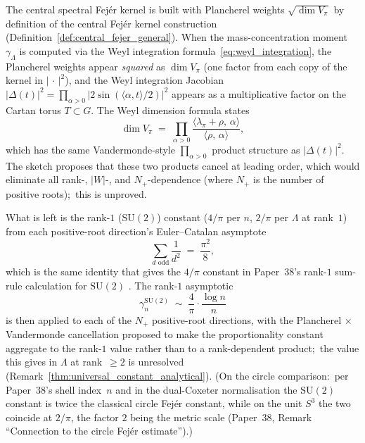 \documentclass[11pt,a4paper]{article}
\theoremstyle{plain}
\theoremstyle{definition}
\newcommand{\Lammax}{\Lambda}
\newcommand{\SU}{\mathrm{SU}}
\begin{document}
The central spectral Fej\'er kernel is built with Plancherel weights
$\sqrt{\dim V_\pi}$ by definition of the central Fej\'er kernel
construction (Definition~\ref{def:central_fejer_general}). When
the mass-concentration moment $\gamma_\Lammax$ is computed via the
Weyl integration formula~\eqref{eq:weyl_integration}, the Plancherel
weights appear \emph{squared} as $\dim V_\pi$ (one factor from each
copy of the kernel in $|\,\cdot\,|^2$), and the Weyl integration
Jacobian $|\Delta(t)|^2 =
\prod_{\alpha > 0} |2 \sin(\langle\alpha, t\rangle/2)|^2$ appears as a
multiplicative factor on the Cartan torus $T \subset G$. The Weyl
dimension formula states
\begin{equation}\label{eq:weyl_dim_universal}
   \dim V_\pi
   \;=\; \prod_{\alpha > 0}
   \frac{\langle \lambda_\pi + \rho,\, \alpha\rangle}
        {\langle\rho,\, \alpha\rangle},
\end{equation}
which has the same Vandermonde-style $\prod_{\alpha > 0}$ product
structure as $|\Delta(t)|^2$. The sketch proposes that these two
products cancel at leading order, which would eliminate all rank-,
$|W|$-, and $N_+$-dependence (where $N_+$ is the number of positive
roots);\ this is unproved.

What is left is the rank-$1$ ($\SU(2)$) constant ($4/\pi$ per $n$,
$2/\pi$ per $\Lammax$ at rank~$1$) from each
positive-root direction's Euler--Catalan asymptote
\begin{equation*}
   \sum_{d \text{ odd}} \frac{1}{d^2} \;=\; \frac{\pi^2}{8},
\end{equation*}
which is the same identity that gives the $4/\pi$ constant in
Paper~38's rank-$1$ sum-rule calculation for $\SU(2)$
\cite[App.~A]{paper38}. The rank-$1$ asymptotic
\begin{equation*}
   \gamma_n^{\SU(2)}
   \;\sim\; \frac{4}{\pi} \cdot \frac{\log n}{n}
\end{equation*}
is then applied to each of the $N_+$ positive-root directions, with the
Plancherel $\times$ Vandermonde cancellation proposed to make the
proportionality constant aggregate to the rank-$1$ value rather than to
a rank-dependent product;\ the value this gives in $\Lammax$ at
rank~$\ge 2$ is unresolved
(Remark~\ref{thm:universal_constant_analytical}). (On the circle comparison:\ per Paper~38's shell index~$n$ and in the dual-Coxeter normalisation the $\SU(2)$ constant is twice the
classical circle Fej\'er constant, while on the unit $S^3$ the two
coincide at $2/\pi$, the factor $2$ being the metric scale (Paper~38, Remark
``Connection to the circle Fej\'er estimate'').)
\end{document}
